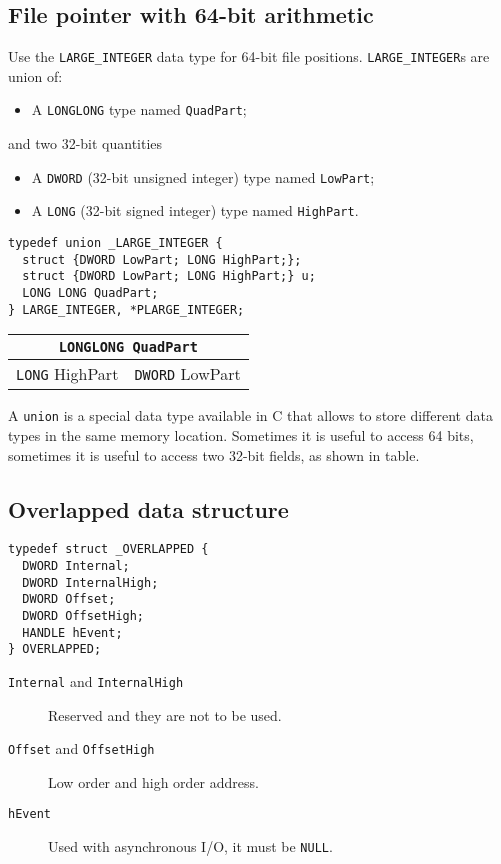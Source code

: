 \subsection{File pointer with 64-bit arithmetic}
Use the \texttt{LARGE\_INTEGER} data type for 64-bit file positions. \texttt{LARGE\_INTEGER}s are union of:
\begin{itemize}
\item A \texttt{LONGLONG} type named \texttt{QuadPart};
\end{itemize}
and two 32-bit quantities
\begin{itemize}
\item A \texttt{DWORD} (32-bit unsigned integer) type named \texttt{LowPart};
\item A \texttt{LONG} (32-bit signed integer) type named \texttt{HighPart}.
\end{itemize}

\begin{verbatim}
typedef union _LARGE_INTEGER {
  struct {DWORD LowPart; LONG HighPart;};
  struct {DWORD LowPart; LONG HighPart;} u;
  LONG LONG QuadPart;
} LARGE_INTEGER, *PLARGE_INTEGER;
\end{verbatim}

\begin{center}
\begin{tabular}{|c|c|}
\hline 
\multicolumn{2}{|c|}{\texttt{LONGLONG QuadPart}} \\ 
\hline 
\texttt{LONG} HighPart & \texttt{DWORD} LowPart \\ 
\hline 
\end{tabular}
\end{center}

A \texttt{union} is a special data type available in C that allows to store different data types in the same memory location. Sometimes it is useful to access 64 bits, sometimes it is useful to access two 32-bit fields, as shown in table.

\subsection{Overlapped data structure}
\begin{verbatim}
typedef struct _OVERLAPPED {
  DWORD Internal;
  DWORD InternalHigh;
  DWORD Offset;
  DWORD OffsetHigh;
  HANDLE hEvent;
} OVERLAPPED;
\end{verbatim}

\begin{description}
\item [\texttt{Internal} and \texttt{InternalHigh}] Reserved and they are not to be used.
\item [\texttt{Offset} and \texttt{OffsetHigh}] Low order and high order address.
\item [\texttt{hEvent}] Used with asynchronous I/O, it must be \texttt{NULL}.
\end{description}

